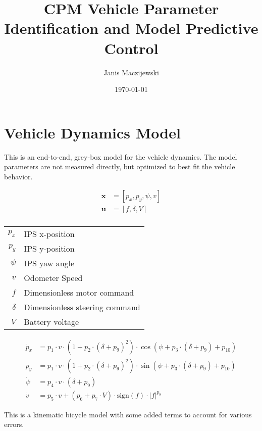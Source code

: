 \documentclass[12pt]{article}
\title{CPM Vehicle Parameter Identification and Model Predictive Control}
\author{Janis Maczijewski}
\date{\today}
\begin{document}
\maketitle

\section{Vehicle Dynamics Model}


This is an end-to-end, grey-box model for the vehicle dynamics. The model parameters are not measured directly, but optimized to best fit the vehicle behavior.

\begin{align*}
\boldsymbol{x} &= [p_x, p_y, \psi, v] \\
\boldsymbol{u} &= [f, \delta, V] \\ 
\end{align*}



\begin{center}
\begin{tabular}{ r | l }
 $p_x$ & IPS x-position  \\ 
 $p_y$ & IPS y-position   \\ 
 $\psi$ & IPS yaw angle  \\ 
 $v$ & Odometer Speed  \\ 
 $f$ & Dimensionless motor command  \\ 
 $\delta$ & Dimensionless steering command  \\ 
 $V$ & Battery voltage  \\ 
\end{tabular}
\end{center}


\begin{align}
\dot{p}_x &= p_1 \cdot v \cdot (1+p_2 \cdot (\delta + p_{9})^2) \cdot \cos(\psi + p_3 \cdot (\delta + p_{9}) + p_{10}) \\
\dot{p}_y &= p_1 \cdot v \cdot (1+p_2 \cdot (\delta + p_{9})^2) \cdot \sin(\psi + p_3 \cdot (\delta + p_{9}) + p_{10}) \\
\dot{\psi} &= p_4 \cdot v \cdot (\delta + p_{9}) \\
\dot{v} &= p_5 \cdot v + (p_6 + p_7 \cdot V) \cdot \text{sign}(f) \cdot |f|^{p_8}
\end{align}

This is a kinematic bicycle model with some added terms to account for various errors.
\end{document}

